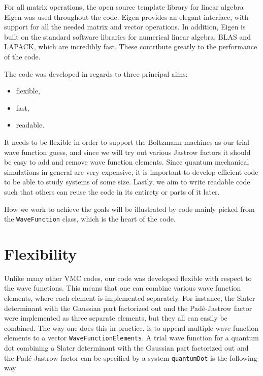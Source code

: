 For all matrix operations, the open source template library for linear algebra Eigen was used throughout the code. Eigen provides an elegant interface, with support for all the needed matrix and vector operations. In addition, Eigen is built on the standard software libraries for numerical linear algebra, BLAS and LAPACK, which are incredibly fast. These contribute greatly to the performance of the code. 

The code was developed in regards to three principal aims:
\begin{center}
	\begin{minipage}{0.2\textwidth}
		\begin{itemize}
			\item flexible,
			\item fast,
			\item readable.
		\end{itemize}
	\end{minipage}
\end{center}
It needs to be flexible in order to support the Boltzmann machines as our trial wave function guess, and since we will try out various Jastrow factors it should be easy to add and remove wave function elements. Since quantum mechanical simulations in general are very expensive, it is important to develop efficient code to be able to study systems of some size. Lastly, we aim to write readable code such that others can reuse the code in its entirety or parts of it later. 

How we work to achieve the goals will be illustrated by code mainly picked from the \texttt{WaveFunction} class, which is the heart of the code. 

\section{Flexibility}
Unlike many other VMC codes, our code was developed flexible with respect to the wave functions. This means that one can combine various wave function elements, where each element is implemented separately. For instance, the Slater determinant with the Gaussian part factorized out and the Padé-Jastrow factor were implemented as three separate elements, but they all can easily be combined. The way one does this in practice, is to append multiple wave function elements to a vector \texttt{WaveFunctionElements}. A trial wave function for a quantum dot combining a Slater determinant with the Gaussian part factorized out and the Padé-Jastrow factor can be specified by a system \texttt{quantumDot} is the following way

